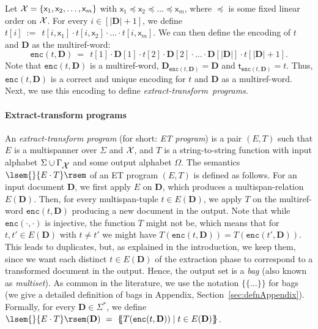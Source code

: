 \documentclass[
a4paper
]{article}
\theoremstyle{plain}
\theoremstyle{definition}
\theoremstyle{remark}
\newcommand{\varset}{\mbox{\ensuremath{\mathcal{X}}}}
\newcommand{\doc}{\ensuremath{\mathbf{D}}}
\newcommand{\getDoc}[1]{\doc_{#1}}
\newcommand{\getSpanTuple}[1]{\textsf{t}_{#1}}
\newcommand{\varsx}{\ensuremath{\textsf{x}}}
\newcommand{\nrefw}[1]{\ensuremath{\mathtt{enc}(#1)}}
\newcommand{\sem}[1]{{\lsem{}{#1}\rsem}}
\newcommand{\multiset}[1]{\{\!\!\{#1\}\!\!\}}
\begin{document}
Let $\varset = \{\varsx_1, \varsx_2, \ldots, \varsx_m\}$ with $\varsx_1 \preceq \varsx_2 \preceq \ldots \preceq \varsx_m$, where $\preceq$ is some fixed linear order on $\varset$. 
For every $i \in [|\doc| + 1]$, we define $t[i] \ := \ \ t[i, \varsx_1] \cdot t[i, \varsx_2] \cdot \ldots \cdot t[i, \varsx_m]$.
We can then define the encoding of $t$ and $\doc$ as the multiref-word:
\begin{equation*}
	\nrefw{t, \doc} \ = \ \ t[1] \cdot \doc[1] \cdot t[2] \cdot \doc[2] \cdot \ldots \cdot \doc[|\doc|] \cdot t[|\doc|{+}1].
\end{equation*}
Note that $\nrefw{t, \doc}$ is
a multiref-word, $\getDoc{\nrefw{t, \doc}} = \doc$ and $\getSpanTuple{\nrefw{t, \doc}} = t$.
Thus, $\nrefw{t, \doc}$ is a correct and unique encoding for $t$ and $\doc$ as a multiref-word.
Next, we use this encoding to define \emph{extract-transform~programs}. 

\paragraph{Extract-transform programs} 
An \emph{extract-transform program}
(for short: \emph{ET program})
is a pair $(E, T)$ such that $E$ is a multispanner over $\Sigma$ and $\varset$, and $T$ is a string-to-string function with input alphabet $\Sigma \cup \Gamma_{\varset}$ and some output alphabet $\Omega$.
The semantics $\sem{E \cdot T}$ 
of an ET program $(E,T)$ is defined as follows. For an input document
$\doc$, we first apply $E$ on $\doc$, which produces a
multispan-relation $E(\doc)$. Then, for every multispan-tuple $t \in
E(\doc)$, we apply $T$ on the multiref-word $\nrefw{t,\doc}$ producing
a new document in the output. Note that while $\nrefw{\cdot, \cdot}$
is injective, the function $T$ might not be, which means that for $t,
t' \in E(\doc)$ with $t \neq t'$ we might have $T(\nrefw{t,\doc}) =
T(\nrefw{t',\doc})$. This leads to duplicates, but, as explained in
the introduction, we keep them, since we want each distinct $t \in
E(\doc)$ of the extraction phase to correspond to a transformed
document in the output. Hence, the output set is a \emph{bag} (also
known as \emph{multiset}).
As common in the literature, we use the notation
$\multiset{\ldots}$ for bags (we give a detailed definition of bags
in Appendix, Section~\ref{sec:defnAppendix}).  
Formally, for every $\doc \in \Sigma^*$, we define $\sem{E \cdot T}(\doc) \ = \ \multiset{T(\nrefw{t, \doc}) \mid t \in E(\doc)}$.
\end{document}
